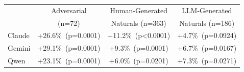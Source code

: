 \begin{tabular}{@{}lccc@{}}
\toprule
 & Adversarial & Human-Generated & LLM-Generated \\
 & (n=72) & Naturals (n=363) & Naturals (n=186) \\
\midrule
Claude & +26.6\%~(p=0.0001) & +11.2\%~(p<0.0001) & +4.7\%~(p=0.0924) \\
Gemini & +29.1\%~(p=0.0001) & +9.3\%~(p=0.0001) & +6.7\%~(p=0.0167) \\
Qwen & +23.1\%~(p=0.0001) & +6.0\%~(p=0.0201) & +7.3\%~(p=0.0271) \\
\bottomrule
\end{tabular}
